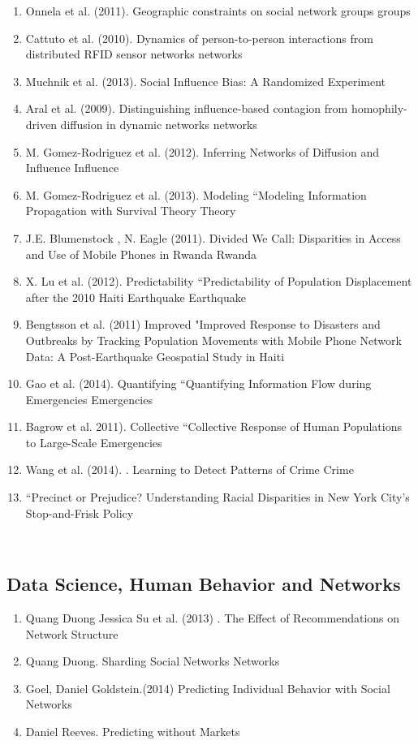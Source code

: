 \begin{enumerate}
\item Onnela et al. (2011).  Geographic constraints on social network groups\cite{Onnela_2011} groups  
\item Cattuto et al. (2010).  Dynamics of person-to-person interactions from distributed RFID sensor networks\cite{Cattuto_2010} networks  
\item Muchnik et al. (2013).  Social Influence Bias: A Randomized Experiment\cite{Muchnik_2013}  
\item Aral et al. (2009).  Distinguishing influence-based contagion from homophily-driven diffusion in dynamic networks\cite{Aral_2009} networks  
\item M. Gomez-Rodriguez et al. (2012).  Inferring Networks of Diffusion and Influence\cite{Gomez_Rodriguez_2012} Influence  
\item  M. Gomez-Rodriguez et al. (2013). Modeling “Modeling  Information Propagation with Survival Theory\cite{rodriguez2013modeling} Theory  
\item J.E. Blumenstock , N. Eagle (2011).  Divided We Call: Disparities in Access and Use of Mobile Phones in Rwanda\cite{blumenstock2012divided} Rwanda  
\item  X. Lu et al. (2012). Predictability “Predictability  of Population Displacement after the 2010 Haiti Earthquake\cite{Lu_2012} Earthquake  
\item  Bengtsson et al. (2011) Improved "Improved  Response to Disasters and Outbreaks by Tracking Population Movements with Mobile Phone Network Data: A Post-Earthquake Geospatial Study in Haiti\cite{Bengtsson_2011}  
\item  Gao et al. (2014). Quantifying “Quantifying  Information Flow during Emergencies\cite{Gao_2014} Emergencies  
\item  Bagrow et al. 2011). Collective “Collective  Response of Human Populations to Large-Scale Emergencies\cite{Bagrow_2011}  \item  Wang et al. (2014). .  Learning to Detect Patterns of Crime\cite{Wang_2013} Crime  
\item  “Precinct or Prejudice? Understanding Racial Disparities in New York City’s Stop-and-Frisk Policy  \end{enumerate}  \\  \subsection{Data Science, Human Behavior and Networks}  \begin{enumerate}  
\item  Quang Duong Jessica Su  et al. (2013) . The Effect of Recommendations on Network Structure  
\item  Quang Duong.  Sharding Social Networks\cite{Duong_2013} Networks  
\item  Goel, Daniel  Goldstein.(2014)  Predicting Individual Behavior with Social Networks \cite{Goel_2014} 
\item  Daniel Reeves. Predicting without Markets  

\end{enumerate}  
\\  

